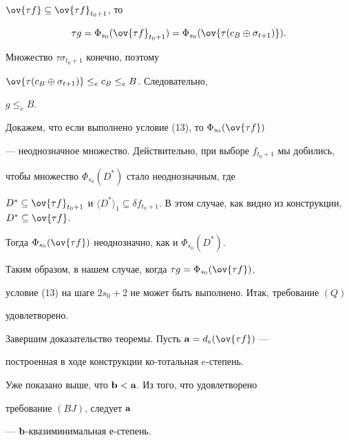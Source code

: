 $\ov{\tau f}\subseteq\ov{\tau f}_{t_0+1}$, то


$$


\tau g=\Phi_{s_0}(\ov{\tau f}_{t_0+1})=\Phi_{s_0}(\ov{\tau(c_B\oplus


\sigma_{t+1})}).


$$


Множество $\tau\sigma_{t_0+1}$ конечно, поэтому


$\ov{\tau(c_B\oplus\sigma_{t+1})}\leq_ec_B\leq_eB$. Следовательно,


$g\leq_eB$.





Докажем, что если выполнено условие (13), то $\Phi_{s_0}(\ov{\tau f})$


--- неоднозначное множество. Действительно, при выборе $f_{t_0+1}$ мы добились,


чтобы множество $\Phi_{s_0}(D^*)$ стало неоднозначным, где


$D^*\subseteq\ov{\tau f}_{t_0+1}$ и $\langle D^*\rangle_1\subseteq\delta


f_{t_0+1}$. В этом случае, как видно из конструкции, $D^*\subseteq\ov{\tau f}$.


Тогда $\Phi_{s_0}(\ov{\tau f})$ неоднозначно, как и $\Phi_{s_0}(D^*)$.


Таким образом, в нашем случае, когда $\tau g=\Phi_{s_0}(\ov{\tau f})$,


условие (13) на шаге $2s_0+2$ не может быть выполнено. Итак, требование $(Q)$


удовлетворено.





Завершим доказательство теоремы. Пусть ${\bold a}=d_e(\ov{\tau f})$ ---


построенная в ходе конструкции ко-тотальная $e$-степень.


Уже показано выше, что ${\bold b}<{\bold a}$. Из того, что удовлетворено


требование $(BJ)$, следует ${\bold a}$


--- ${\bold b}$-квазиминимальная $е$-степень.








